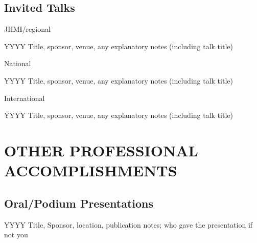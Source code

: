 \documentclass[11pt]{article}
\newenvironment{lyxlist}[1]
	{\begin{list}{}
		{\setlength\itemsep{-0.5ex}
		\settowidth{\labelwidth}{#1}
		 \setlength{\leftmargin}{\labelwidth}
		 \addtolength{\leftmargin}{\labelsep}
		 \renewcommand{\makelabel}[1]{##1\hfil}}}
	{\end{list}}
\begin{document}
\subsection*{Invited Talks} 
\begin{lyxlist}{JHMI/regional}
\item[{\textcolor{color1}{JHMI/regional}}]
\item[{YYYY}]Title, sponsor, venue, any explanatory notes (including talk title)

\item[{\textcolor{color1}{National}}]
\item[{YYYY}]Title, sponsor, venue, any explanatory notes (including talk title)

\item[{\textcolor{color1}{International}}]
\item[{YYYY}]Title, sponsor, venue, any explanatory notes (including talk title)


\end{lyxlist}
	

\section*{OTHER PROFESSIONAL ACCOMPLISHMENTS}
\subsection*{Oral/Podium Presentations}
\begin{lyxlist}{JHMI/regional}
\item[{YYYY}]Title, Sponsor, location, publication notes; who gave the presentation if not you
\end{lyxlist}
	
\end{document}
